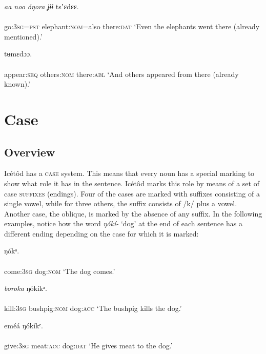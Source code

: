 \ea\label{ex:}
\textit{aa noo   óŋora ʝɨɨ}     tsʼɛdɛɛ. \\
    \\
go:\textsc{3sg=pst}   elephant:\textsc{nom}=also   there:\textsc{dat}
\glt ‘Even the elephants went there (already mentioned).’ 
\z




\ea\label{ex:}
     tʉmɛdɔɔ. \\
    \\
appear:\textsc{seq}   others:\textsc{nom}   there:\textsc{abl}
\glt ‘And others appeared from there (already known).’ 
\z




\section{Case}



\subsection{Overview}


Icétôd has a \textsc{case} system. This means that every noun has a special marking to show what role it has in the sentence. Icétôd marks this role by means of a set of case \textsc{suffixes} (endings). Four of the cases are marked with suffixes consisting of a single vowel, while for three others, the suffix consists of /k/ plus a vowel. Another case, the oblique, is marked by the absence of any suffix. In the following examples, notice how the word \textit{ŋókí-} ‘dog’ at the end of each sentence has a different ending depending on the case for which it is marked:




\ea\label{ex:}
     ŋókᵃ. \\
    \\
come:\textsc{3sg}   dog:\textsc{nom}
\glt ‘The dog comes.’ 
\z




\ea\label{ex:}
     \textit{boroka}     ŋókíkᵃ. \\
    \\
kill:\textsc{3sg}   bushpig:\textsc{nom}   dog:\textsc{acc}
\glt ‘The bushpig kills the dog.’ 
\z




\ea\label{ex:}
     eméá     ŋókíkᵉ. \\
    \\
give:\textsc{3sg}   meat:\textsc{acc}   dog:\textsc{dat}
\glt ‘He gives meat to the dog.’ 
\z




